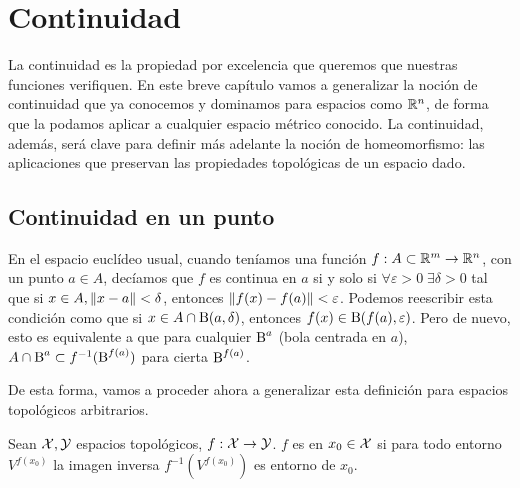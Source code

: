 \chapter{Continuidad}
\label{cont}

La continuidad es la propiedad por excelencia que queremos que nuestras funciones verifiquen. En este breve capítulo vamos a generalizar la noción de continuidad que ya conocemos y dominamos para espacios como $\mathbb{R}^n$, de forma que la podamos aplicar a cualquier espacio métrico conocido. La continuidad, además, será clave para definir más adelante la noción de homeomorfismo: las aplicaciones que preservan las propiedades topológicas de un espacio dado.

\section{Continuidad en un punto}

En el espacio euclídeo usual, cuando teníamos una función $f:A\subset\mathbb{R}^m\to\mathbb{R}^n$, con un punto $a\in A$, decíamos que $f$ es continua en $a$ si y solo si $\forall\varepsilon > 0\;\exists\delta > 0$ tal que si $x\in A,\lVert x-a\rVert<\delta$, entonces $\lVert f(x)-f(a)\rVert<\varepsilon$. Podemos reescribir esta condición como que si $x\in A\cap\operatorname{B}(a,\delta)$, entonces $f(x)\in\operatorname{B}(f(a),\varepsilon)$. Pero de nuevo, esto es equivalente a que para cualquier $\operatorname{B}^a$ (bola centrada en $a$), $A\cap \operatorname{B}^a\subset f^{-1}(\operatorname{B}^{f(a)})$ para cierta $\operatorname{B}^{f(a)}$.

De esta forma, vamos a proceder ahora a generalizar esta definición para espacios topológicos arbitrarios.

\begin{defi}
	Sean $\mathcal{X},\mathcal{Y}$ espacios topológicos, $f:\mathcal{X}\to\mathcal{Y}$. $f$ es  en $x_0\in\mathcal{X}$ si para todo entorno $V^{f(x_0)}$ la imagen inversa $f^{-1}(V^{f(x_0)})$ es entorno de $x_0$. 
\end{defi}

